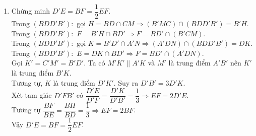 \begin{bt}
{\begin{enumerate}
{\begin{tikzpicture}[scale=1, font=\footnotesize, line join=round, line cap=round, >=stealth]
				\end{tikzpicture}
			}
			\item Chứng minh $D'E=BF=\dfrac{1}{2}EF$.\\
			Trong $(BDD'B')\colon$ gọi $H=BD\cap CM\Rightarrow (B'MC)\cap (BDD'B')=B'H$.\\
			Trong $(BDD'B')\colon$ $F=B'H\cap BD'\Rightarrow F=BD'\cap (B'CM)$.\\
			Trong $(BDD'B')\colon$ gọi $K=B'D'\cap A'N\Rightarrow (A'DN)\cap (BDD'B')=DK$.\\
			Trong $(BDD'B')\colon$ $E=DK\cap BD'\Rightarrow F=BD'\cap (A'DN)$.\\
			Gọi $K'=C'M'=B'D'$. Ta có $M'K'\parallel A'K$ và $M'$ là trung điểm $A'B'$ nên $K'$ là trung điểm $B'K$.\\
			Tương tự, $K$ là trung điểm $D'K'$. Suy ra $D'B'=3D'K$.\\
			Xét tam giác $D'FB'$ có $\dfrac{D'E}{D'F}=\dfrac{D'K}{D'B'}=\dfrac{1}{3}\Rightarrow EF=2D'E$.\\
			Tương tự $\dfrac{BF}{BE}=\dfrac{BH}{BD}=\dfrac{1}{3}\Rightarrow EF=2BF$.\\
			Vậy $D'E=BF=\dfrac{1}{2}EF$.
		\end{enumerate}
	}
\end{bt}


